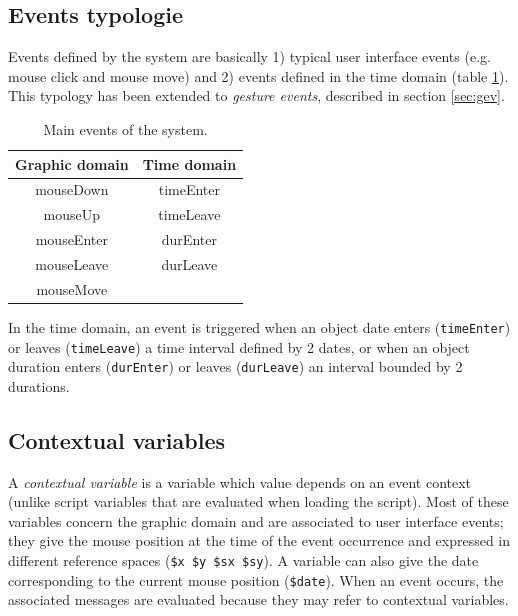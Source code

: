 \documentclass{article}
\newcommand{\code}[1]		{\texttt{\small #1}}
\begin{document}
\subsection{Events typologie}\label{subsec:typologie}

Events defined by the system are basically 1) typical user interface events (e.g. mouse click and mouse move) and 2) events defined in the time domain (table \ref{tbl:evts}). This typology has been extended to \emph{gesture events}, described in section \ref{sec:gev}.

\begin{table}[htdp]
\begin{center}
\begin{tabular}{c|c}
Graphic domain & Time domain \\
\hline
mouseDown 		& timeEnter	\\
mouseUp			& timeLeave	\\
mouseEnter		& durEnter		\\
mouseLeave		& durLeave		\\
mouseMove		&				\\
\end{tabular}
\end{center}
\caption{Main events of the system.}
\label{tbl:evts}
\end{table}%

In the time domain, an event is triggered when an object date enters (\code{timeEnter}) or leaves (\code{timeLeave}) a time interval defined by 2 dates, or when an object duration enters (\code{durEnter}) or leaves (\code{durLeave}) an interval bounded by 2 durations.

\subsection{Contextual variables}
A \emph{contextual variable} is a variable which value depends on an event context (unlike script variables that are evaluated when loading the script). 
Most of these variables concern the graphic domain and are associated to user interface events; they give the mouse position at the time of the event occurrence and expressed in different reference spaces (\code{\$x \$y \$sx \$sy}). A variable can also give the date corresponding to the current mouse position (\code{\$date}).
When an event occurs, the associated messages are evaluated because they may refer to contextual variables. 
\end{document}
